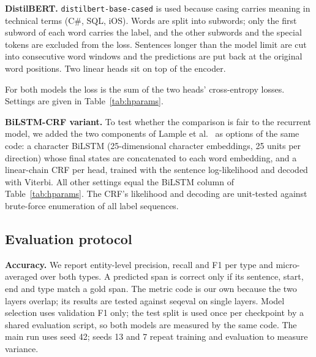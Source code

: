 \documentclass[runningheads]{llncs}
\begin{document}
\textbf{DistilBERT.} \texttt{distilbert-base-cased} is used because casing carries meaning in
technical terms (C\#, SQL, iOS). Words are split into subwords; only the first subword of each word
carries the label, and the other subwords and the special tokens are excluded from the loss. Sentences
longer than the model limit are cut into consecutive word windows and the predictions are put back at
the original word positions. Two linear heads sit on top of the encoder.

For both models the loss is the sum of the two heads' cross-entropy losses. Settings are given in
Table~\ref{tab:hparams}.

\textbf{BiLSTM-CRF variant.} To test whether the comparison is fair to the recurrent model, we added
the two components of Lample et al.\ \cite{lample2016ner} as options of the same code: a character
BiLSTM (25-dimensional character embeddings, 25 units per direction) whose final states are
concatenated to each word embedding, and a linear-chain CRF per head, trained with the sentence
log-likelihood and decoded with Viterbi. All other settings equal the BiLSTM column of
Table~\ref{tab:hparams}. The CRF's likelihood and decoding are unit-tested against brute-force
enumeration of all label sequences.

\begin{table}[t]
\centering
\caption{Training settings (from \texttt{run\_info.json} of each run). Both use seed 42 and keep the
epoch with the best validation F1.}
\label{tab:hparams}
\end{table}

\subsection{Evaluation protocol}
\textbf{Accuracy.} We report entity-level precision, recall and F1 per type and micro-averaged over both
types. A predicted span is correct only if its sentence, start, end and type match a gold span. The
metric code is our own because the two layers overlap; its results are tested against seqeval
\cite{nakayama2018seqeval} on single layers. Model selection uses validation F1 only; the test split is
used once per checkpoint by a shared evaluation script, so both models are measured by the same code.
The main run uses seed 42; seeds 13 and 7 repeat training and evaluation to measure variance.
\end{document}

